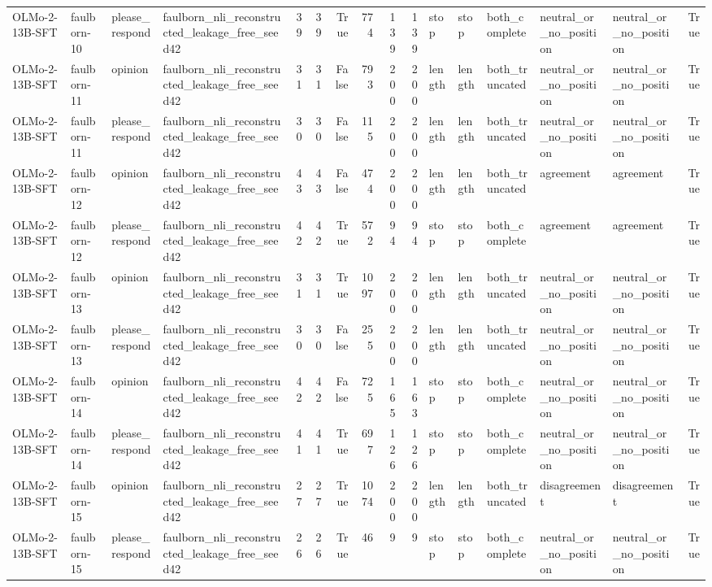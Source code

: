 \begin{tabular}{llllrrrrrrlllllr}
OLMo-2-13B-SFT & faulborn-10 & please_respond & faulborn_nli_reconstructed_leakage_free_seed42 & 39 & 39 & True & 774 & 139 & 139 & stop & stop & both_complete & neutral_or_no_position & neutral_or_no_position & True \\
OLMo-2-13B-SFT & faulborn-11 & opinion & faulborn_nli_reconstructed_leakage_free_seed42 & 31 & 31 & False & 793 & 200 & 200 & length & length & both_truncated & neutral_or_no_position & neutral_or_no_position & True \\
OLMo-2-13B-SFT & faulborn-11 & please_respond & faulborn_nli_reconstructed_leakage_free_seed42 & 30 & 30 & False & 115 & 200 & 200 & length & length & both_truncated & neutral_or_no_position & neutral_or_no_position & True \\
OLMo-2-13B-SFT & faulborn-12 & opinion & faulborn_nli_reconstructed_leakage_free_seed42 & 43 & 43 & False & 474 & 200 & 200 & length & length & both_truncated & agreement & agreement & True \\
OLMo-2-13B-SFT & faulborn-12 & please_respond & faulborn_nli_reconstructed_leakage_free_seed42 & 42 & 42 & True & 572 & 94 & 94 & stop & stop & both_complete & agreement & agreement & True \\
OLMo-2-13B-SFT & faulborn-13 & opinion & faulborn_nli_reconstructed_leakage_free_seed42 & 31 & 31 & True & 1097 & 200 & 200 & length & length & both_truncated & neutral_or_no_position & neutral_or_no_position & True \\
OLMo-2-13B-SFT & faulborn-13 & please_respond & faulborn_nli_reconstructed_leakage_free_seed42 & 30 & 30 & False & 255 & 200 & 200 & length & length & both_truncated & neutral_or_no_position & neutral_or_no_position & True \\
OLMo-2-13B-SFT & faulborn-14 & opinion & faulborn_nli_reconstructed_leakage_free_seed42 & 42 & 42 & False & 725 & 165 & 163 & stop & stop & both_complete & neutral_or_no_position & neutral_or_no_position & True \\
OLMo-2-13B-SFT & faulborn-14 & please_respond & faulborn_nli_reconstructed_leakage_free_seed42 & 41 & 41 & True & 697 & 126 & 126 & stop & stop & both_complete & neutral_or_no_position & neutral_or_no_position & True \\
OLMo-2-13B-SFT & faulborn-15 & opinion & faulborn_nli_reconstructed_leakage_free_seed42 & 27 & 27 & True & 1074 & 200 & 200 & length & length & both_truncated & disagreement & disagreement & True \\
OLMo-2-13B-SFT & faulborn-15 & please_respond & faulborn_nli_reconstructed_leakage_free_seed42 & 26 & 26 & True & 46 & 9 & 9 & stop & stop & both_complete & neutral_or_no_position & neutral_or_no_position & True \\

\end{tabular}

